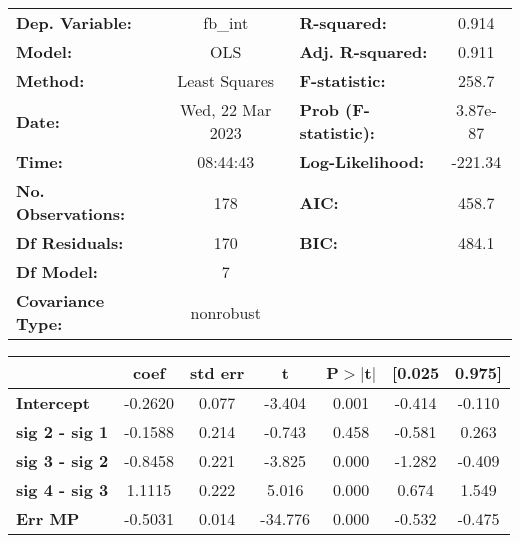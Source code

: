 \begin{center}
\begin{tabular}{lclc}
\toprule
\textbf{Dep. Variable:}    &     fb\_int      & \textbf{  R-squared:         } &    0.914  \\
\textbf{Model:}            &       OLS        & \textbf{  Adj. R-squared:    } &    0.911  \\
\textbf{Method:}           &  Least Squares   & \textbf{  F-statistic:       } &    258.7  \\
\textbf{Date:}             & Wed, 22 Mar 2023 & \textbf{  Prob (F-statistic):} & 3.87e-87  \\
\textbf{Time:}             &     08:44:43     & \textbf{  Log-Likelihood:    } &  -221.34  \\
\textbf{No. Observations:} &         178      & \textbf{  AIC:               } &    458.7  \\
\textbf{Df Residuals:}     &         170      & \textbf{  BIC:               } &    484.1  \\
\textbf{Df Model:}         &           7      & \textbf{                     } &           \\
\textbf{Covariance Type:}  &    nonrobust     & \textbf{                     } &           \\
\bottomrule
\end{tabular}
\end{center}\begin{center}
\begin{tabular}{lcccccc}
\toprule
                                & \textbf{coef} & \textbf{std err} & \textbf{t} & \textbf{P$> |$t$|$} & \textbf{[0.025} & \textbf{0.975]}  \\
\midrule
\textbf{Intercept}              &      -0.2620  &        0.077     &    -3.404  &         0.001        &       -0.414    &       -0.110     \\
\textbf{sig 2 - sig 1}          &      -0.1588  &        0.214     &    -0.743  &         0.458        &       -0.581    &        0.263     \\
\textbf{sig 3 - sig 2}          &      -0.8458  &        0.221     &    -3.825  &         0.000        &       -1.282    &       -0.409     \\
\textbf{sig 4 - sig 3}          &       1.1115  &        0.222     &     5.016  &         0.000        &        0.674    &        1.549     \\
\textbf{Err MP}                 &      -0.5031  &        0.014     &   -34.776  &         0.000        &       -0.532    &       -0.475     \\

\end{tabular}
\end{center}
